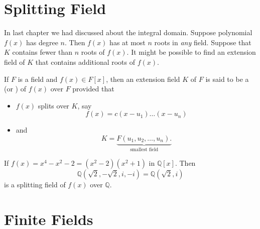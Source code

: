 \section{Splitting Field}

In last chapter we had discussed about the integral domain. Suppose 
polynomial $f(x)$ has degree $n$. Then $f(x)$ has at most $n$ roots in \textit{any} field. 
Suppose that $K$ contains fewer than $n$ roots of $f(x)$. It might be possible to find an extension field of 
$K$ that contains additional roots of $f(x)$. 

\begin{definition}
    If $F$ is a field and $f(x) \in F[x]$, then an extension field $K$ of $F$ is said to 
    be a  (or ) of $f(x)$ over $F$ provided that 
    \begin{itemize}
        \item $f(x)$ splits over $K$, say 
        \begin{equation}
            f(x) = c(x-u_1)\ldots (x-u_n)
        \end{equation}
        \item and
        \begin{equation}
            K = \underbrace{F(u_1, u_2, \ldots, u_n).}_{\text{smallest field}}
        \end{equation}
    \end{itemize}
\end{definition}

\begin{example}
    If $f(x) = x^4 - x^2 - 2 = (x^2 - 2)(x^2 + 1)$ in $\mathbb{Q}[x]$. Then 
    \[
        \mathbb{Q}(\sqrt{2}, -\sqrt{2}, i, -i) = \mathbb{Q}(\sqrt{2}, i)
    \]
    is a splitting field of $f(x)$ over $\mathbb{Q}$.
\end{example}


\section{Finite Fields}

